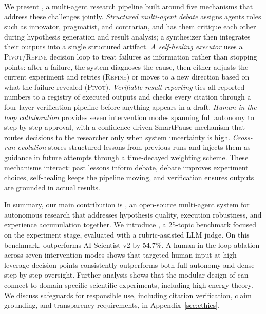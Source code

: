 We present \system{}, a multi-agent research pipeline built around five mechanisms that address these challenges jointly.
\textit{Structured multi-agent debate} assigns agents roles such as innovator, pragmatist, and contrarian, and has them critique each other during hypothesis generation and result analysis; a synthesizer then integrates their outputs into a single structured artifact.
\textit{A self-healing executor} uses a \textsc{Pivot}/\textsc{Refine} decision loop to treat failures as information rather than stopping points: after a failure, the system diagnoses the cause, then either adjusts the current experiment and retries (\textsc{Refine}) or moves to a new direction based on what the failure revealed (\textsc{Pivot}).
\textit{Verifiable result reporting} ties all reported numbers to a registry of executed outputs and checks every citation through a four-layer verification pipeline before anything appears in a draft.
\textit{Human-in-the-loop collaboration} provides seven intervention modes spanning full autonomy to step-by-step approval, with a confidence-driven SmartPause mechanism that routes decisions to the researcher only when system uncertainty is high.
\textit{Cross-run evolution} stores structured lessons from previous runs and injects them as guidance in future attempts through a time-decayed weighting scheme.
These mechanisms interact: past lessons inform debate, debate improves experiment choices, self-healing keeps the pipeline moving, and verification ensures outputs are grounded in actual results.

In summary, our main contribution is \system{}, an open-source multi-agent system for autonomous research that addresses hypothesis quality, execution robustness, and experience accumulation together.
We introduce \bench, a 25-topic benchmark focused on the experiment stage, evaluated with a rubric-assisted LLM judge.
On this benchmark, \system{} outperforms AI Scientist v2 by 54.7\%.
A human-in-the-loop ablation across seven intervention modes shows that targeted human input at high-leverage decision points consistently outperforms both full autonomy and dense step-by-step oversight.
Further analysis shows that the modular design of \system{} can connect to domain-specific scientific experiments, including high-energy theory.
We discuss safeguards for responsible use, including citation verification, claim grounding, and transparency requirements, in Appendix~\ref{sec:ethics}.

